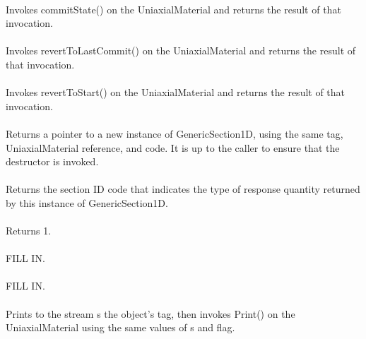  \\
Invokes commitState() on the UniaxialMaterial and returns the
result of that invocation. \\

 \\
Invokes revertToLastCommit() on the UniaxialMaterial and returns the
result of that invocation. \\

 \\
Invokes revertToStart() on the UniaxialMaterial and returns the
result of that invocation. \\

 \\
Returns a pointer to a new instance of GenericSection1D, using the
same tag, UniaxialMaterial reference, and code. It is up to the caller to
ensure that the destructor is invoked. \\

 \\
Returns the section ID code that indicates the type of response quantity 
returned by this instance of GenericSection1D. \\

 \\
Returns 1. \\

\\
FILL IN. \\

\\
FILL IN. \\

 \\
Prints to the stream \p s the object's \p tag, then invokes
Print() on the UniaxialMaterial using the same values of \p s
and \p flag. \\
